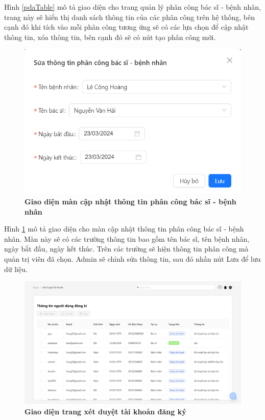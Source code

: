 Hình \ref{pdaTable} mô tả giao diện cho trang quản lý phân công bác sĩ - bệnh nhân, trang này sẽ hiển thị danh sách
thông tin của các phân công trên hệ thống, bên cạnh đó khi tích vào mỗi phân công tương ứng sẽ 
có các lựa chọn để cập nhật thông tin, xóa thông tin, bên cạnh đó sẽ có nút tạo phân công mới. 

\begin{figure}[H]
  \centering
  \includegraphics[scale=0.7]{Images/server/webUI/editPDA.png}
  \caption[Giao diện màn cập nhật thông tin phân công bác sĩ - bệnh nhân]{\bfseries \fontsize{12pt}{0pt}\selectfont Giao diện màn cập nhật thông tin phân công bác sĩ - bệnh nhân}
  \label{editPDA} %
\end{figure}

Hình \ref{editPDA} mô tả giao diện cho màn cập nhật thông tin phân công bác sĩ - bệnh nhân. Màn này sẽ có các trường thông tin bao gồm 
tên bác sĩ, tên bệnh nhân, ngày bắt đầu, ngày kết thúc. Trên các trường sẽ hiện thông tin phân công mà quản trị viên đã chọn. 
Admin sẽ chỉnh sửa thông tin, sau đó nhấn nút Lưu để lưu dữ liệu.

\begin{figure}[H]
  \centering
  \includegraphics[scale=0.5]{Images/server/webUI/registerTable.png}
  \caption[Giao diện trang quản lý phê duyệt tài khoản]{\bfseries \fontsize{12pt}{0pt}\selectfont Giao diện trang xét duyệt tài khoản đăng ký}
  \label{registerTable} %
\end{figure}

